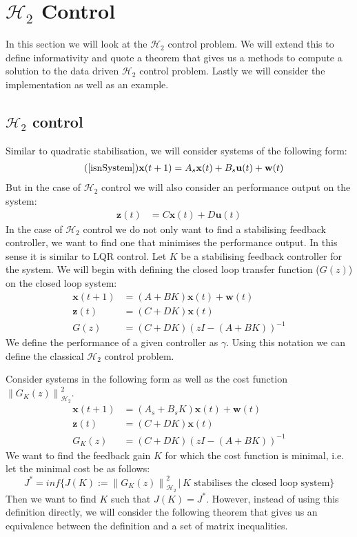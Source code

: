 \section{$\mathcal{H}_2$ Control}
In this section we will look at the $\mathcal{H}_2$ control problem. We will extend this to define informativity and quote a theorem that gives us a methods to compute a solution to the data driven $\mathcal{H}_2$ control problem. Lastly we will consider the implementation as well as an example.

\subsection{$\mathcal{H}_2$ control}
Similar to quadratic stabilisation, we will consider systems of the following form:
\begin{align} \tag{\ref{isnSystem}}
\mathbf{x}(t+1) &= A_s \mathbf{x}(t) + B_s \mathbf{u}(t) + \mathbf{w}(t)
\end{align}
But in the case of $\mathcal{H}_2$ control we will also consider an performance output on the system:
\begin{align*}
	\mathbf{z}(t) &= C \mathbf{x}(t) + D \mathbf{u}(t)
\end{align*}
In the case of $\mathcal{H}_2$ control we do not only want to find a stabilising feedback controller, we want to find one that minimises the performance output. In this sense it is similar to LQR control. Let $K$ be a stabilising feedback controller for the system. We will begin with defining the closed loop transfer function ($G(z)$) on the closed loop system:
\begin{align*}
	\mathbf{x}(t+1) &= (A + B K) \mathbf{x}(t) + \mathbf{w}(t) \\
	\mathbf{z}(t)   &= (C   + D   K) \mathbf{x}(t) \\
	G(z) &= (C + DK)(z I - (A+BK))^{-1}
\end{align*}
We define the performance of a given controller as $\gamma$. Using this notation we can define the classical $\mathcal{H}_2$ control problem.

\cite[Problem 11.1]{bookTrentelman} Consider systems in the following form as well as the cost function $\left\| G_K(z) \right\|^2_{\mathcal{H}_2}$.
\begin{align*}
	\mathbf{x}(t+1) &= (A_s + B_s K) \mathbf{x}(t) + \mathbf{w}(t) \\
	\mathbf{z}(t)   &= (C   + D   K) \mathbf{x}(t) \\
	G_K(z) &= (C + DK)(z I - (A+BK))^{-1}
\end{align*}
We want to find the feedback gain $K$ for which the cost function is minimal, i.e. let the minimal cost be as follows:
\begin{equation*}
	J^\ast = inf \{ J(K) := \left\| G_K(z) \right\|^2_{\mathcal{H}_2} \, | \, K \mbox{ stabilises the closed loop system}\}
\end{equation*}
Then we want to find $K$ such that $J(K) = J^\ast$. However, instead of using this definition directly, we will consider the following theorem that gives us an equivalence between the definition and a set of matrix inequalities.

